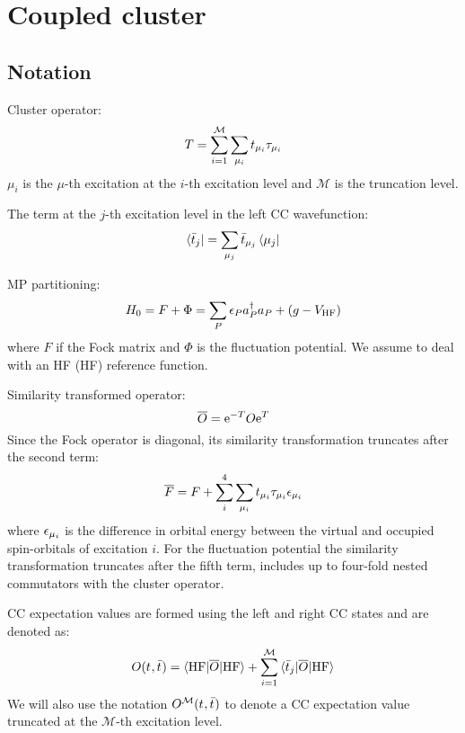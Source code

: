 \chapter{Coupled cluster}\label{ch:PCMCC}

\section{Notation}
Cluster operator:
\begin{equation}
  T = \sum_{i=1}^\mathcal{M}\sum_{\mu_i}t_{\mu_i}\tau_{\mu_i}
\end{equation}
$\mu_i$ is the $\mu$-th excitation at the $i$-th
excitation level and $\mathcal{M}$ is the truncation level.

The term at the $j$-th excitation level in the left CC wavefunction:
\begin{equation}
  \bra{\bar{t}_{j}} = \sum_{\mu_j}\bar{t}_{\mu_j}\bra{\mu_j}
\end{equation}

\acl{MP} partitioning:
\begin{equation}
 H_0 = F + \Phi = \sum_P\epsilon_Pa_{P}^{\dagger}a_{P} + (g- V_\mathrm{HF})
\end{equation}
where $F$ if the Fock matrix and $\Phi$ is the fluctuation potential.
We assume to deal with an \acl{HF} (\acs{HF}) reference function.

Similarity transformed operator:
\begin{equation}
  \overline{O} =\mathrm{e}^{-T}O\mathrm{e}^{T}
\end{equation}
Since the Fock operator is diagonal, its similarity transformation
truncates after the second term:
\begin{equation}
  \overline{F} = F + \sum_{i}^4\sum_{\mu_i}t_{\mu_i}\tau_{\mu_i}\epsilon_{\mu_i}
\end{equation}
where $\epsilon_{\mu_i}$ is the difference in orbital energy between the
virtual and occupied spin-orbitals of excitation $i$.
For the fluctuation potential the similarity transformation truncates
after the fifth term, \ie{} includes up to four-fold nested commutators
with the cluster operator.

\acs{CC} expectation values are formed using the left and
right \acs{CC} states and are denoted as:
\begin{equation}
  O(t_{}, \bar{t}_{}) = \braket{\mathrm{HF} | \overline{O} | \mathrm{HF} }
  + \sum_{i=1}^{\mathcal{M}}\braket{\bar{t}_{j} | \overline{O} | \mathrm{HF} }
\end{equation}
We will also use the notation $O^\mathcal{M}(t_{}, \bar{t}_{})$ to
denote a \acs{CC} expectation value truncated at the $\mathcal{M}$-th
excitation level.


